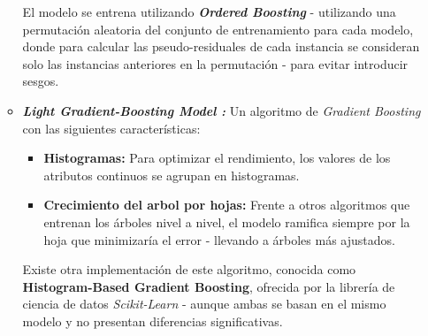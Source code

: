 \begin{itemize}[leftmargin=*]
\begin{itemize}
		El modelo se entrena utilizando \textbf{\textit{Ordered Boosting}} - utilizando una permutación aleatoria del conjunto de entrenamiento para cada modelo, donde para calcular las pseudo-residuales de cada instancia se consideran solo las instancias anteriores en la permutación \cite{catboost2} - para evitar introducir sesgos.
		\item \textbf{\textit{Light Gradient-Boosting Model \cite{NIPS2017_6449f44a}:}} Un algoritmo de \textit{Gradient Boosting} con las siguientes características:
		\begin{itemize}
			\item \textbf{Histogramas:} Para optimizar el rendimiento, los valores de los atributos continuos se agrupan en histogramas.
			\item \textbf{Crecimiento del arbol por hojas:} Frente a otros algoritmos que entrenan los árboles nivel a nivel, el modelo ramifica siempre por la hoja que minimizaría el error - llevando a árboles más ajustados.
		\end{itemize}
		
		Existe otra implementación de este algoritmo, conocida como \textbf{Histogram-Based Gradient Boosting}, ofrecida por la librería de ciencia de datos \textit{Scikit-Learn} \cite{scikit-learn} - aunque ambas se basan en el mismo modelo y no presentan diferencias significativas.
	\end{itemize}
\end{itemize}

